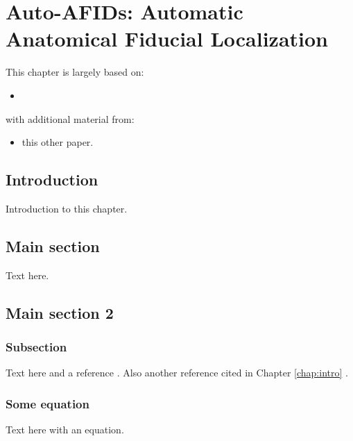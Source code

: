 \chapter{Auto-AFIDs: Automatic Anatomical Fiducial Localization}\label{chap:Autoafids}
\newpage
\sloppy
This chapter is largely based on:
\begin{itemize}[noitemsep,topsep=0pt]
	\item \cite{taha2023}
\end{itemize}
with additional material from:
\begin{itemize}[noitemsep,topsep=0pt]
	\item this other paper.
\end{itemize}

\section{Introduction}
Introduction to this chapter.

\section{Main section}

Text here.

\section{Main section 2}
\subsection{Subsection}

Text here and a reference \cite{Author2018}. Also another reference cited in Chapter \ref{chap:intro} \cite{Author1990}.

\subsection{Some equation}

Text here with an equation.
